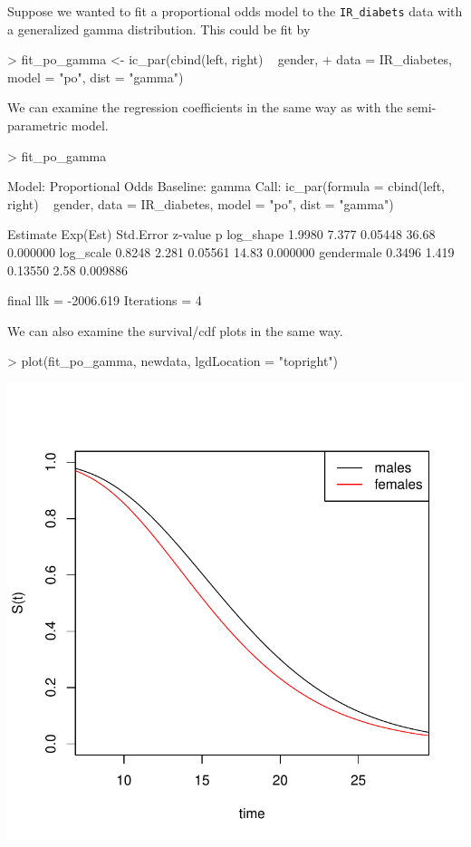 \documentclass[a4paper]{article}
\begin{document}
Suppose we wanted to fit a proportional odds model to the \texttt{IR\_diabets} data with a generalized gamma distribution. This could be fit by
  
\begin{Schunk}
\begin{Sinput}
> fit_po_gamma <- ic_par(cbind(left, right) ~ gender,
+     data = IR_diabetes, model = "po", dist = "gamma")
\end{Sinput}
\end{Schunk}

  We can examine the regression coefficients in the same way as with the semi-parametric model.
  

\begin{Schunk}
\begin{Sinput}
> fit_po_gamma
\end{Sinput}
\begin{Soutput}
Model:  Proportional Odds
Baseline:  gamma 
Call: ic_par(formula = cbind(left, right) ~ gender, data = IR_diabetes, 
    model = "po", dist = "gamma")

           Estimate Exp(Est) Std.Error z-value        p
log_shape    1.9980    7.377   0.05448   36.68 0.000000
log_scale    0.8248    2.281   0.05561   14.83 0.000000
gendermale   0.3496    1.419   0.13550    2.58 0.009886

final llk =  -2006.619 
Iterations =  4 
\end{Soutput}
\end{Schunk}

  We can also examine the survival/cdf plots in the same way. 
  
\begin{Schunk}
\begin{Sinput}
> plot(fit_po_gamma, newdata, lgdLocation = "topright")
\end{Sinput}
\end{Schunk}
\includegraphics{icenReg-012}
\end{document}
